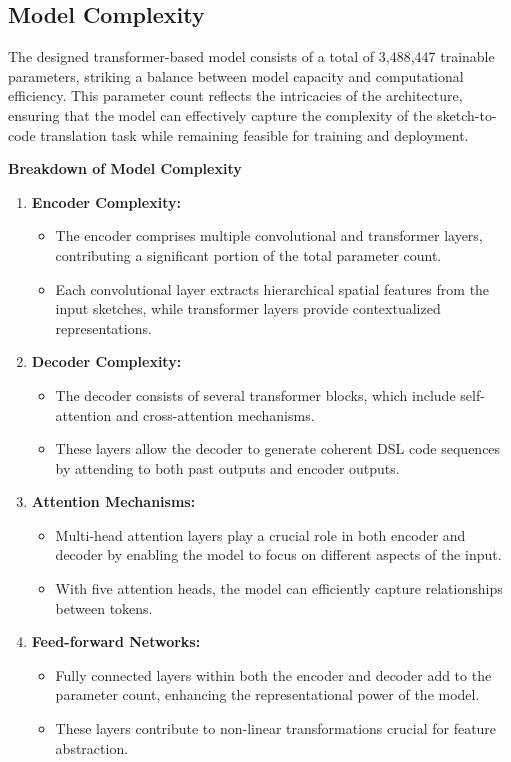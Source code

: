 \subsection{Model Complexity}
The designed transformer-based model consists of a total of 3,488,447 trainable parameters, striking a balance between model capacity and computational efficiency. This parameter count reflects the intricacies of the architecture, ensuring that the model can effectively capture the complexity of the sketch-to-code translation task while remaining feasible for training and deployment.

\textbf{Breakdown of Model Complexity}

\begin{enumerate}
    \item \textbf{Encoder Complexity:}
        \begin{itemize}
            \item The encoder comprises multiple convolutional and transformer layers, contributing a significant portion of the total parameter count.
            \item Each convolutional layer extracts hierarchical spatial features from the input sketches, while transformer layers provide contextualized representations. 
        \end{itemize}
    \item \textbf{Decoder Complexity:}
        \begin{itemize}
            \item The decoder consists of several transformer blocks, which include self-attention and cross-attention mechanisms.
            \item These layers allow the decoder to generate coherent DSL code sequences by attending to both past outputs and encoder outputs.
        \end{itemize}
    \item \textbf{Attention Mechanisms:}
        \begin{itemize}
            \item Multi-head attention layers play a crucial role in both encoder and decoder by enabling the model to focus on different aspects of the input.
            \item With five attention heads, the model can efficiently capture relationships between tokens.
        \end{itemize}
    \item \textbf{Feed-forward Networks:}
        \begin{itemize}
            \item Fully connected layers within both the encoder and decoder add to the parameter count, enhancing the representational power of the model.
            \item These layers contribute to non-linear transformations crucial for feature abstraction.
        \end{itemize}
\end{enumerate}


